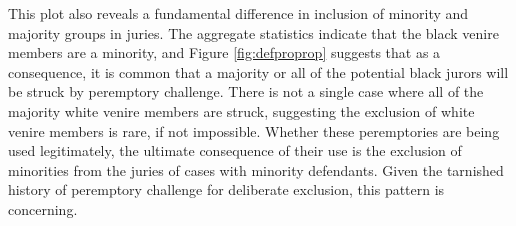 This plot also reveals a fundamental difference in inclusion of minority and majority groups in juries. The aggregate statistics indicate that the
black venire members are a minority, and Figure \ref{fig:defproprop} suggests that as a consequence, it is common that a majority
or all of the potential black jurors will be struck by peremptory
challenge. There is not a single case where all of the majority white
venire members are struck, suggesting the exclusion of
white venire members is rare, if not impossible. Whether these
peremptories are being used legitimately, the ultimate consequence of
their use is the exclusion of minorities from the juries of cases with
minority defendants. Given the tarnished history of peremptory
challenge for deliberate exclusion, this pattern is concerning.
